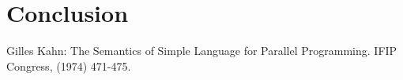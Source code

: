 \documentclass{llncs}
\begin{document}
\section{Conclusion}



%
%

\begin{thebibliography}{1}
Gilles Kahn:
The Semantics of Simple Language for Parallel Programming.
IFIP Congress, (1974) 471-475.
\end{thebibliography}
\end{document}
